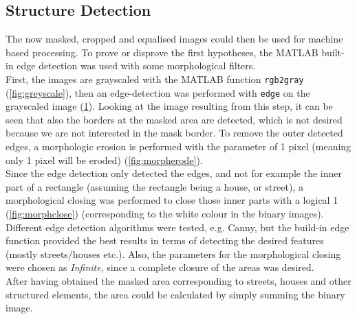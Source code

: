 \subsection{Structure Detection}
The now masked, cropped and equalised images could then be used for machine based processing. To prove or disprove the first hypotheses, the MATLAB built-in edge detection was used with some morphological filters. \\
First, the images are grayscaled with the MATLAB function \texttt{rgb2gray} (\cref{fig:greyscale}), then an edge-detection was performed with \texttt{edge} on the grayscaled image (\cref{fig:edge_detect}). Looking at the image resulting from this step, it can be seen that also the borders at the masked area are detected, which is not desired because we are not interested in the mask border. To remove the outer detected edges, a morphologic erosion is performed with the parameter of 1 pixel (meaning only 1 pixel will be eroded) (\cref{fig:morpherode}). \\
Since the edge detection only detected the edges, and not for example the inner part of a rectangle (assuming the rectangle being a house, or street), a morphological closing was performed to close those inner parts with a logical 1 (\cref{fig:morphclose}) (corresponding to the white colour in the binary images). Different edge detection algorithms were tested, e.g. Canny, but the build-in edge function provided the best results in terms of detecting the desired features (mostly streets/houses etc.). Also, the parameters for the morphological closing were chosen as \textit{Infinite}, since a complete closure of the  areas was desired.\\
After having obtained the masked area corresponding to streets, houses and other structured elements, the area could be calculated by simply summing the binary image.


\begin{figure}[h!]
\centering
\begin{minipage}{.5\textwidth}
	\centering
	\label{fig:greyscale}
\end{minipage}%
\begin{minipage}{.5\textwidth}
	\centering
	\label{fig:edge_detect}
\end{minipage}
\end{figure}

